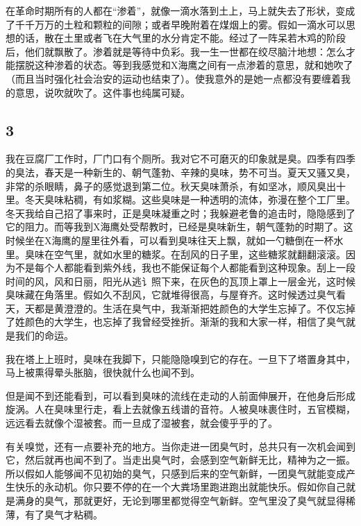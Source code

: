 在革命时期所有的人都在“渗着”，就像一滴水落到土上，马上就失去了形状，变成了千千万万的土粒和颗粒的间隙；或者早晚附着在煤烟上的雾。假如一滴水可以思想的话，散在土里或者飞在大气里的水分肯定不能。经过了一阵呆若木鸡的阶段后，他们就飘散了。渗着就是等待中负彩。我一生一世都在绞尽脑汁地想：怎么才能摆脱这种渗着的状态。等到我感觉和X海鹰之间有一点渗着的意思，就和她吹了（而且当时强化社会治安的运动也结束了）。使我意外的是她一点都没有要缠着我的意思，说吹就吹了。这件事也纯属可疑。 

\subsection{3} 

我在豆腐厂工作时，厂门口有个厕所。我对它不可磨灭的印象就是臭。四季有四季的臭法，春天是一种新生的、朝气蓬勃、辛辣的臭味，势不可当。夏天又骚又臭，非常的杀眼睛，鼻子的感觉退到第二位。秋天臭味萧杀，有如坚冰，顺风臭出十里。冬天臭味粘稠，有如浆糊。这些臭味是一种透明的流体，弥漫在整个工厂里。冬天我给自己招了事来时，正是臭味凝重之时；我躲避老鲁的追击时，隐隐感到了它的阻力。而等我到X海鹰处受帮教时，已经是臭味新生，朝气蓬勃的时期了。这时候坐在X海鹰的屋里往外看，可以看到臭味往天上飘，就如一勺糖倒在一杯水里。臭味在空气里，就如水里的糖浆。在刮风的日子里，这些糖浆就翻翻滚滚。因为不是每个人都能看到紫外线，我也不能保证每个人都能看到这种现象。刮上一段时间的风，风和日丽，阳光从逃讠照下来，在灰色的瓦顶上罩上一层金光，这时候臭味藏在角落里。假如久不刮风，它就堆得很高，与屋脊齐。这时候透过臭气看天，天都是黄澄澄的。生活在臭气中，我渐渐把姓颜色的大学生忘掉了。不仅忘掉了姓颜色的大学生，也忘掉了我曾经受挫折。渐渐的我和大家一样，相信了臭气就是我们的命运。 

我在塔上上班时，臭味在我脚下，只能隐隐嗅到它的存在。一旦下了塔置身其中，马上被熏得晕头胀脑，很快就什么也闻不到。 

但是闻不到还能看到，可以看到臭味的流线在走动的人前面伸展开，在他身后形成旋涡。人在臭味里行走，看上去就像五线谱的音符。人被臭味裹住时，五官模糊，远远看去就像个湿被套。而一旦成了湿被套，就会傻乎乎的了。 

有关嗅觉，还有一点要补充的地方。当你走进一团臭气时，总共只有一次机会闻到它，然后就再也闻不到了。当走出臭气时，会感到空气新鲜无比，精神为之一振。所以假如人能够闻不见初始的臭气，只感到后来的空气新鲜，一团臭气就能变成产生快乐的永动机。你只要不停的在一个大粪场里跑进跑出就能快乐。假如你自己就是满身的臭气，那就更好，无论到哪里都觉得空气新鲜。空气里没了臭气就显得稀薄，有了臭气才粘稠。 

